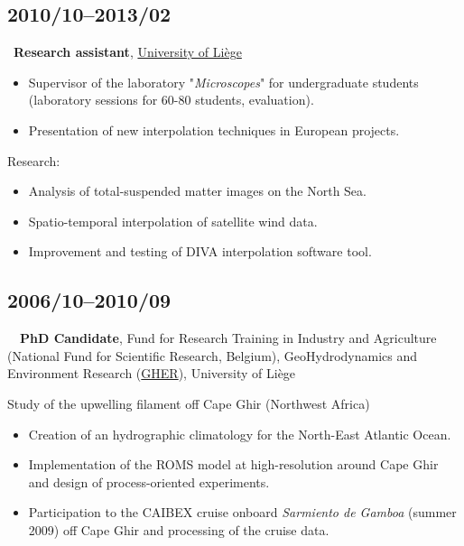 \documentclass[11pt,a4paper,sans,svgnames]{moderncv}
\newlength{\logowidth}
\begin{document}
\subsection{2010/10--2013/02}

~\textbf{Research assistant}, \href{www.ulg.ac.be}{University of Li\`{e}ge}
\begin{itemize}%
\item Supervisor of the laboratory "\textit{Microscopes}" for undergraduate students\\ (laboratory sessions for 60-80 students, evaluation).
\item Presentation of new interpolation techniques in European projects.
\end{itemize}
Research:
\begin{itemize}%
\item Analysis of total-suspended matter images on the North Sea.
\item Spatio-temporal interpolation of satellite wind data.
\item Improvement and testing of DIVA interpolation software tool.
\end{itemize}


\subsection{2006/10--2010/09}

~~{\textbf{PhD Candidate}}, {Fund for Research Training in Industry and Agriculture (National Fund for Scientific Research, Belgium)}, {GeoHydrodynamics and Environment Research (\href{http://modb.oce.ulg.ac.be/}{GHER}), University of Li\`{e}ge}

Study of the upwelling filament off Cape Ghir (Northwest Africa)
\begin{itemize}%
\item Creation of an hydrographic climatology for the North-East Atlantic Ocean.
\item Implementation of the ROMS model at high-resolution around Cape Ghir and design of process-oriented experiments.
\item Participation to the CAIBEX cruise onboard \textit{Sarmiento de Gamboa} (summer 2009) off Cape Ghir and processing of the cruise data.
\end{itemize}
\end{document}
